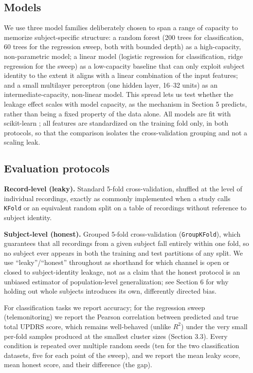 \documentclass[11pt]{article}
\begin{document}
\subsection{Models}
We use three model families deliberately chosen to span a range of capacity to memorize subject-specific structure: a random forest (200 trees for classification, 60 trees for the regression sweep, both with bounded depth) as a high-capacity, non-parametric model; a linear model (logistic regression for classification, ridge regression for the sweep) as a low-capacity baseline that can only exploit subject identity to the extent it aligns with a linear combination of the input features; and a small multilayer perceptron (one hidden layer, 16--32 units) as an intermediate-capacity, non-linear model. This spread lets us test whether the leakage effect scales with model capacity, as the mechanism in Section 5 predicts, rather than being a fixed property of the data alone. All models are fit with scikit-learn \cite{pedregosa2011}; all features are standardized on the training fold only, in both protocols, so that the comparison isolates the cross-validation grouping and not a scaling leak.

\subsection{Evaluation protocols}
\textbf{Record-level (leaky).} Standard 5-fold cross-validation, shuffled at the level of individual recordings, exactly as commonly implemented when a study calls \texttt{KFold} or an equivalent random split on a table of recordings without reference to subject identity.

\textbf{Subject-level (honest).} Grouped 5-fold cross-validation (\texttt{GroupKFold}), which guarantees that all recordings from a given subject fall entirely within one fold, so no subject ever appears in both the training and test partitions of any split. We use ``leaky''/``honest'' throughout as shorthand for which channel is open or closed to subject-identity leakage, not as a claim that the honest protocol is an unbiased estimator of population-level generalization; see Section 6 for why holding out whole subjects introduces its own, differently directed bias.

For classification tasks we report accuracy; for the regression sweep (telemonitoring) we report the Pearson correlation between predicted and true total UPDRS score, which remains well-behaved (unlike $R^2$) under the very small per-fold samples produced at the smallest cluster sizes (Section 3.3). Every condition is repeated over multiple random seeds (ten for the two classification datasets, five for each point of the sweep), and we report the mean leaky score, mean honest score, and their difference (the gap).
\end{document}
